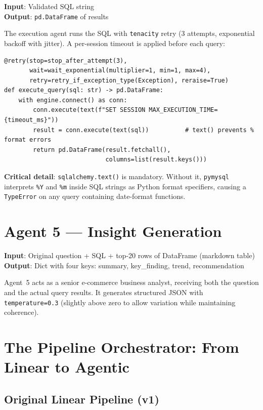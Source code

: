\documentclass[12pt,a4paper]{report}
\begin{document}
\textbf{Input}: Validated SQL string\\
\textbf{Output}: \texttt{pd.DataFrame} of results

The execution agent runs the SQL with \texttt{tenacity} retry (3 attempts, exponential backoff
with jitter). A per-session timeout is applied before each query:

\begin{lstlisting}[caption={Execution agent with retry and timeout}]
@retry(stop=stop_after_attempt(3),
       wait=wait_exponential(multiplier=1, min=1, max=4),
       retry=retry_if_exception_type(Exception), reraise=True)
def execute_query(sql: str) -> pd.DataFrame:
    with engine.connect() as conn:
        conn.execute(text(f"SET SESSION MAX_EXECUTION_TIME={timeout_ms}"))
        result = conn.execute(text(sql))          # text() prevents % format errors
        return pd.DataFrame(result.fetchall(),
                            columns=list(result.keys()))
\end{lstlisting}

\textbf{Critical detail}: \texttt{sqlalchemy.text()} is mandatory. Without it,
\texttt{pymysql} interprets \texttt{\%Y} and \texttt{\%m} inside SQL strings as Python format
specifiers, causing a \texttt{TypeError} on any query containing date-format functions.

\section{Agent 5 — Insight Generation}

\textbf{Input}: Original question + SQL + top-20 rows of DataFrame (markdown table)\\
\textbf{Output}: Dict with four keys: summary, key\_finding, trend, recommendation

Agent~5 acts as a senior e-commerce business analyst, receiving both the question and the
actual query results. It generates structured JSON with \texttt{temperature=0.3} (slightly
above zero to allow variation while maintaining coherence).

\section{The Pipeline Orchestrator: From Linear to Agentic}
\label{sec:agentic}

\subsection{Original Linear Pipeline (v1)}
\end{document}
